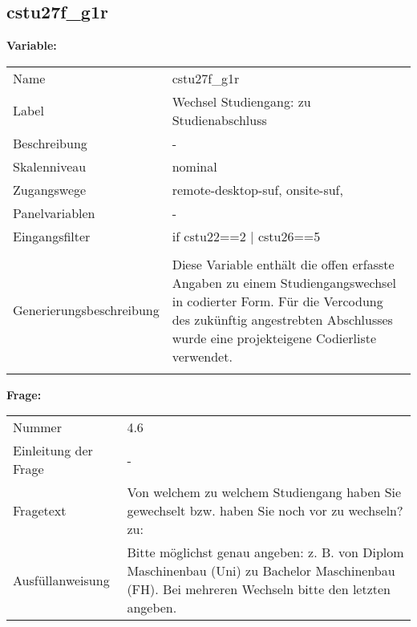 	
	
	\subsection{cstu27f\_g1r}
	\label{subSection:cstu27f_g1r}

	\noindent\textbf{Variable:}\\
		\begin{tabular}{lL{11.3cm}}
			\label{tableVariable:cstu27f_g1r}
			Name & cstu27f\_g1r \\
			Label & Wechsel Studiengang: zu Studienabschluss \\
			Beschreibung & - \\
			Skalenniveau & nominal \\
			Zugangswege &
				remote-desktop-suf,
				onsite-suf,
 \\
			Panelvariablen & -
			 \\
			Eingangsfilter & if cstu22==2 | cstu26==5 \\
 \\
					Generierungsbeschreibung & Diese Variable enthält die offen erfasste Angaben zu einem Studiengangswechsel in codierter Form. Für die Vercodung des zukünftig angestrebten Abschlusses wurde eine projekteigene Codierliste verwendet.
				 \\	
			 \\
		\end{tabular}

		\vspace*{1 cm}
		\noindent\textbf{Frage:}\\
		\begin{tabular}{lL{11.3cm}}
			\label{tableQuestion:cstu27f_g1r}
			Nummer & 4.6 \\
			Einleitung der Frage & - \\
			Fragetext & Von welchem zu welchem Studiengang haben Sie gewechselt bzw. haben Sie noch vor zu wechseln?
zu: \\
			Ausfüllanweisung & Bitte möglichst genau angeben: z. B. von Diplom Maschinenbau
(Uni) zu Bachelor Maschinenbau (FH).
Bei mehreren Wechseln bitte den letzten angeben. \\
		\end{tabular}





